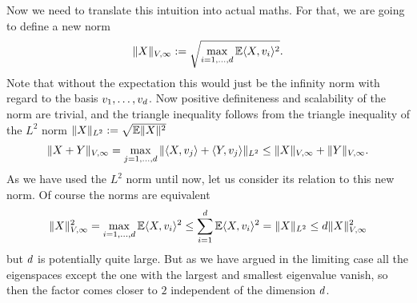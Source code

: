 Now we need to translate this intuition into actual maths. For that, we are
going to define a new norm
\begin{align}
	\|X\|_{V,\infty}
	:= \sqrt{\max_{i=1,\dots,d} \mathbb{E}\langle X, v_i\rangle^2}.
\end{align}
Note that without the expectation this would just be the infinity norm with regard
to the basis \(v_1,\dots,v_d\). Now positive definiteness and
scalability of the norm are trivial, and the triangle inequality follows from the
triangle inequality of the \(L^2\) norm \(\|X\|_{L^2} := \sqrt{\mathbb{E}\|X\|^2}\)
\begin{align*}
	\|X+Y\|_{V,\infty}
	= \max_{j=1,\dots,d} \|\langle X, v_j\rangle + \langle Y, v_j\rangle\|_{L^2}
	\le \|X\|_{V,\infty} + \|Y\|_{V,\infty}.
\end{align*}
As we have used the \(L^2\) norm until now, let us consider its relation
to this new norm. Of course the norms are equivalent
\begin{align*}
	\|X\|_{V,\infty}^2
	= \max_{i=1,\dots,d} \mathbb{E}\langle X, v_i\rangle^2
	\le \sum_{i=1}^d \mathbb{E}\langle X, v_i\rangle^2
	= \|X\|_{L^2}
	\le d \|X\|_{V,\infty}^2
\end{align*}
but \(d\) is potentially quite large. But as we have argued in the
limiting case all the eigenspaces except the one with the largest and smallest
eigenvalue vanish, so then the factor comes closer to \(2\) independent of the
dimension \(d\).

